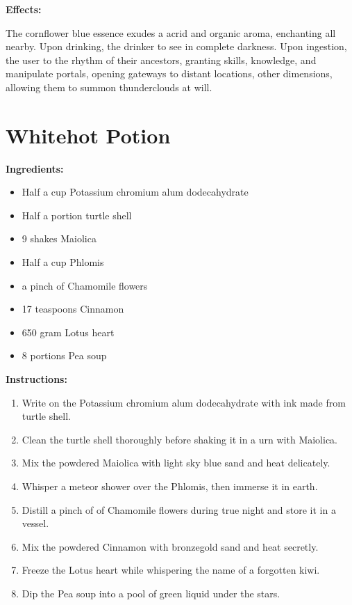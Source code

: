 \documentclass{article}
\begin{document}
\textbf{Effects:}

The cornflower blue essence exudes a acrid and organic aroma, enchanting all nearby. Upon drinking, the drinker to see in complete darkness. Upon ingestion, the user to the rhythm of their ancestors, granting skills, knowledge, and manipulate portals, opening gateways to distant locations, other dimensions, allowing them to summon thunderclouds at will.

\newpage
\section*{Whitehot Potion}

\textbf{Ingredients:}

\begin{itemize}
  \item Half a cup Potassium chromium alum dodecahydrate
  \item Half a portion turtle shell
  \item 9 shakes Maiolica
  \item Half a cup Phlomis
  \item a pinch of Chamomile flowers
  \item 17 teaspoons Cinnamon
  \item 650 gram Lotus heart
  \item 8 portions Pea soup
\end{itemize}

\textbf{Instructions:}

\begin{enumerate}
  \item Write on the Potassium chromium alum dodecahydrate with ink made from turtle shell.
  \item Clean the turtle shell thoroughly before shaking it in a urn with Maiolica.
  \item Mix the powdered Maiolica with light sky blue sand and heat delicately.
  \item Whisper a meteor shower over the Phlomis, then immerse it in earth.
  \item Distill a pinch of of Chamomile flowers during true night and store it in a vessel.
  \item Mix the powdered Cinnamon with bronzegold sand and heat secretly.
  \item Freeze the Lotus heart while whispering the name of a forgotten kiwi.
  \item Dip the Pea soup into a pool of green liquid under the stars.
\end{enumerate}
\end{document}
